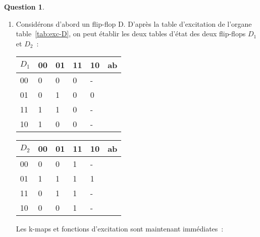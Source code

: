 \documentclass[11pt,a4paper,dvipsnames,]{article}
\theoremstyle{definition}%
\newtheorem{Q}{Question}[] %
\begin{document}
\begin{Q}
{		\begin{enumerate}
			\item Considérons d'abord un flip-flop D.
			D'après la table d'excitation de l'organe table~\ref{tab:exc-D}, on peut établir les deux tables d'état des deux flip-flops $D_1$ et $D_2$~:
			\begin{center}
				\begin{tabular}{|l|l|l|l|l|l} \hline
				$D_1$ & 00         & 01         & 11         & 10         & \multicolumn{1}{l|}{ab} \\ \hline
				00           & 0 & 0 & 0 & - & \\ \cline{1-5}
				01           & 0 & 1 & 0 & 0 & \\ \cline{1-5}
				11           & 1 & 1 & 0 & - & \\ \cline{1-5}
				10           & 1 & 0 & 0 & - & \\ \cline{1-5}
				\end{tabular}
				\begin{tabular}{|l|l|l|l|l|l} \hline
				$D_2$ & 00         & 01         & 11         & 10         & \multicolumn{1}{l|}{ab} \\ \hline
				00           & 0 & 0 & 1 & - & \\ \cline{1-5}
				01           & 1 & 1 & 1 & 1 & \\ \cline{1-5}
				11           & 0 & 1 & 1 & - & \\ \cline{1-5}
				10           & 0 & 0 & 1 & - & \\ \cline{1-5}
				\end{tabular}
			\end{center}

			Les k-maps et fonctions d'excitation sont maintenant immédiates~:
			\begin{center}

			\end{center}



\end{enumerate}}
\end{Q}
\end{document}
